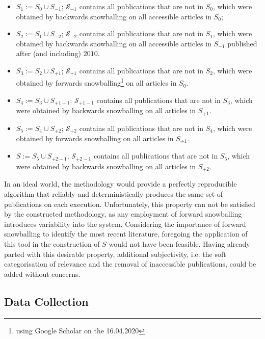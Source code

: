 \documentclass[11pt,a4paper]{book}
\theoremstyle{definition}
\theoremstyle{definition}
\theoremstyle{definition}
\theoremstyle{remark}
\newcommand{\tpsetb}{\mathcal{S}_{\mathit{-1}}}
\newcommand{\tpsetbb}{\mathcal{S}_{\mathit{-2}}}
\newcommand{\tpsetf}{\mathcal{S}_{\mathit{+1}}}
\newcommand{\tpsetff}{\mathcal{S}_{\mathit{+2}}}
\newcommand{\tpsetfb}{\mathcal{S}_{\mathit{+1-1}}}
\newcommand{\tpsetffb}{\mathcal{S}_{\mathit{+2-1}}}
\newcommand{\pset}{S}
\newcommand{\psetz}{S_{\mathit{0}}}
\newcommand{\psetb}{S_{\mathit{-1}}}
\newcommand{\psetbb}{S_{\mathit{-2}}}
\newcommand{\psetf}{S_{\mathit{+1}}}
\newcommand{\psetff}{S_{\mathit{+2}}}
\newcommand{\psetfb}{S_{\mathit{+1-1}}}
\newcommand{\psetffb}{S_{\mathit{+2-1}}}
\begin{document}
\begin{itemize}
\item $\pset_1:= \psetz \cup \psetb$; $\tpsetb$ contains all publications that are not in $\psetz$, which were obtained by backwards snowballing on all accessible articles in $\psetz$; 
\item $\pset_2:= \pset_1 \cup \psetbb$; $\tpsetbb$ contains all publications that are not in $\pset_1$, which were obtained by backwards snowballing on all accessible articles in $\psetb$ published after (and including) $2010$.
\item $\pset_3:= \pset_2 \cup \psetf$; $\tpsetf$ contains all publications that are not in $\pset_2$, which were obtained by forwards snowballing\footnote{using Google Scholar on the 16.04.2020} on all articles in $\psetz$.
\item $\pset_4:= \pset_3 \cup \psetfb$; $\tpsetfb$ contains all publications that are not in $\pset_3$, which were obtained by backwards snowballing on all articles in $\psetf$.
\item $\pset_5:= \pset_4 \cup \psetff$; $\tpsetff$ contains all publications that are not in $\pset_4$, which were obtained by forwards snowballing on all articles in $\psetf$.
\item $\pset:= \pset_5 \cup \psetffb$; $\tpsetffb$ contains all publications that are not in $\pset_5$, which were obtained by backwards snowballing on all articles in $\psetff$.
\end{itemize}

In an ideal world, the methodology would provide a perfectly reproducible algorithm that reliably and deterministically produces the same set of publications on each execution.
Unfortunately, this property can not be satisfied by the constructed methodology, as any employment of forward snowballing introduces variability into the system. Considering the importance of forward snowballing to identify the most recent literature, foregoing the application of this tool in the construction of $\pset$ would not have been feasible. Having already parted with this desirable property, additional subjectivity, i.e. the soft categorisation of relevance and the removal of inaccessible publications, could be added without concerns.


\subsection{Data Collection}
\end{document}
